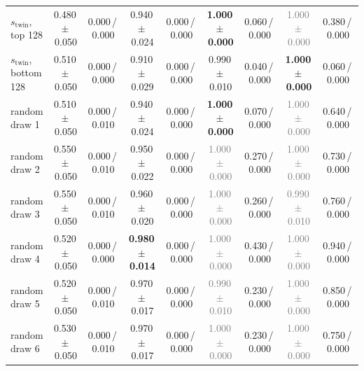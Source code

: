 \begin{tabular}{@{}lcccccccc@{}}
$s_{\text{twin}}$, top 128 & 0.480\,{\scriptsize$\pm$\,0.050} & {\scriptsize 0.000\,/\,0.000} & 0.940\,{\scriptsize$\pm$\,0.024} & {\scriptsize 0.000\,/\,0.000} & \textbf{1.000\,{\scriptsize$\pm$\,0.000}} & {\scriptsize 0.060\,/\,0.000} & \textcolor{gray}{1.000\,{\scriptsize$\pm$\,0.000}} & {\scriptsize 0.380\,/\,0.000} \\
$s_{\text{twin}}$, bottom 128 & 0.510\,{\scriptsize$\pm$\,0.050} & {\scriptsize 0.000\,/\,0.000} & 0.910\,{\scriptsize$\pm$\,0.029} & {\scriptsize 0.000\,/\,0.000} & 0.990\,{\scriptsize$\pm$\,0.010} & {\scriptsize 0.040\,/\,0.000} & \textbf{1.000\,{\scriptsize$\pm$\,0.000}} & {\scriptsize 0.060\,/\,0.000} \\
\midrule
random draw 1 & 0.510\,{\scriptsize$\pm$\,0.050} & {\scriptsize 0.000\,/\,0.010} & 0.940\,{\scriptsize$\pm$\,0.024} & {\scriptsize 0.000\,/\,0.000} & \textbf{1.000\,{\scriptsize$\pm$\,0.000}} & {\scriptsize 0.070\,/\,0.000} & \textcolor{gray}{1.000\,{\scriptsize$\pm$\,0.000}} & {\scriptsize 0.640\,/\,0.000} \\
random draw 2 & 0.550\,{\scriptsize$\pm$\,0.050} & {\scriptsize 0.000\,/\,0.010} & 0.950\,{\scriptsize$\pm$\,0.022} & {\scriptsize 0.000\,/\,0.000} & \textcolor{gray}{1.000\,{\scriptsize$\pm$\,0.000}} & {\scriptsize 0.270\,/\,0.000} & \textcolor{gray}{1.000\,{\scriptsize$\pm$\,0.000}} & {\scriptsize 0.730\,/\,0.000} \\
random draw 3 & 0.550\,{\scriptsize$\pm$\,0.050} & {\scriptsize 0.000\,/\,0.010} & 0.960\,{\scriptsize$\pm$\,0.020} & {\scriptsize 0.000\,/\,0.000} & \textcolor{gray}{1.000\,{\scriptsize$\pm$\,0.000}} & {\scriptsize 0.260\,/\,0.000} & \textcolor{gray}{0.990\,{\scriptsize$\pm$\,0.010}} & {\scriptsize 0.760\,/\,0.000} \\
random draw 4 & 0.520\,{\scriptsize$\pm$\,0.050} & {\scriptsize 0.000\,/\,0.000} & \textbf{0.980\,{\scriptsize$\pm$\,0.014}} & {\scriptsize 0.000\,/\,0.000} & \textcolor{gray}{1.000\,{\scriptsize$\pm$\,0.000}} & {\scriptsize 0.430\,/\,0.000} & \textcolor{gray}{1.000\,{\scriptsize$\pm$\,0.000}} & {\scriptsize 0.940\,/\,0.000} \\
\midrule
random draw 5 & 0.520\,{\scriptsize$\pm$\,0.050} & {\scriptsize 0.000\,/\,0.010} & 0.970\,{\scriptsize$\pm$\,0.017} & {\scriptsize 0.000\,/\,0.000} & \textcolor{gray}{0.990\,{\scriptsize$\pm$\,0.010}} & {\scriptsize 0.230\,/\,0.000} & \textcolor{gray}{1.000\,{\scriptsize$\pm$\,0.000}} & {\scriptsize 0.850\,/\,0.000} \\
random draw 6 & 0.530\,{\scriptsize$\pm$\,0.050} & {\scriptsize 0.000\,/\,0.010} & 0.970\,{\scriptsize$\pm$\,0.017} & {\scriptsize 0.000\,/\,0.000} & \textcolor{gray}{1.000\,{\scriptsize$\pm$\,0.000}} & {\scriptsize 0.230\,/\,0.000} & \textcolor{gray}{1.000\,{\scriptsize$\pm$\,0.000}} & {\scriptsize 0.750\,/\,0.000} \\

\end{tabular}
